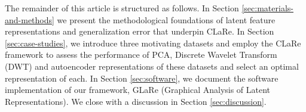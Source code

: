 The remainder of this article is structured as follows.
In Section \ref{sec:materials-and-methods} we present the methodological foundations of latent feature representations and generalization error that underpin CLaRe. 
In Section \ref{sec:case-studies}, we introduce three motivating datasets and employ the CLaRe framework to assess the performance of PCA, Discrete Wavelet Transform (DWT) and autoencoder representations of these datasets and select an optimal representation of each.
In Section \ref{sec:software}, we document the software implementation of our framework, GLaRe (Graphical Analysis of Latent Representations).
We close with a discussion in Section \ref{sec:discussion}.





